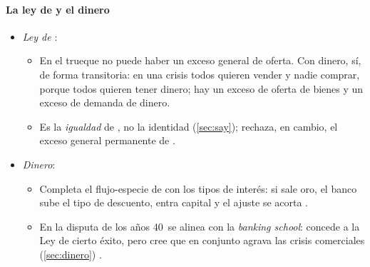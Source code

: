 \documentclass[11pt]{article}
\begin{document}
\paragraph{La ley de  y el dinero}\label{sec:mill-say}
\begin{itemize}
\item \emph{Ley de }:
  \begin{itemize}
  \item En el trueque no puede haber un exceso general de oferta. Con dinero, sí, de forma transitoria: en una crisis todos quieren vender y nadie comprar, porque todos quieren tener dinero; hay un exceso de oferta de bienes y un exceso de demanda de dinero\nocite{Mill1844Essays}.
  \item Es la \emph{igualdad} de , no la identidad (\ref{sec:say}); rechaza, en cambio, el exceso general permanente de .
  \end{itemize}
\item \emph{Dinero}:
  \begin{itemize}
  \item Completa el flujo-especie de \textcite{Hume1752Balance} con los tipos de interés: si sale oro, el banco sube el tipo de descuento, entra capital y el ajuste se acorta .
  \item En la disputa de los años 40~se alinea con la \emph{banking school}\nocite{HET2026Bullion}: concede a la Ley de  cierto éxito, pero cree que en conjunto agrava las crisis comerciales\nocite{Mill1909Principles} (\ref{sec:dinero}) .
  \end{itemize}
\end{itemize}
\end{document}
